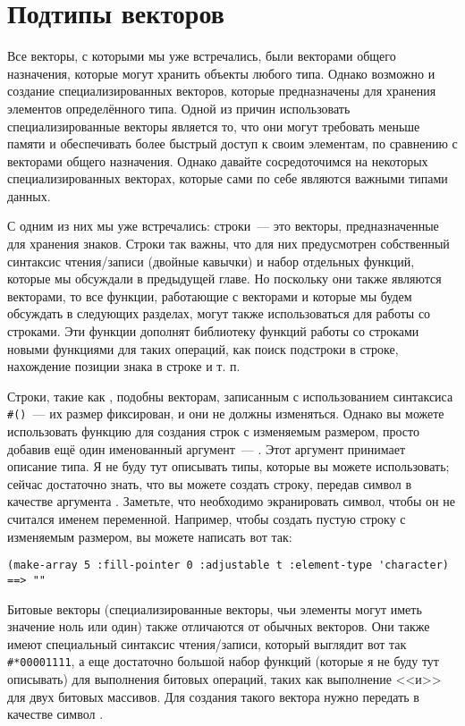 \section{Подтипы векторов}

Все векторы, с которыми мы уже встречались, были векторами общего назначения, которые
могут хранить объекты любого типа.  Однако возможно и создание специализированных
векторов, которые предназначены для хранения элементов определённого типа.  Одной из
причин использовать специализированные векторы является то, что они могут требовать
меньше памяти и обеспечивать более быстрый доступ к своим элементам, по сравнению с
векторами общего назначения.  Однако давайте сосредоточимся на некоторых
специализированных векторах, которые сами по себе являются важными типами данных.

С одним из них мы уже встречались: строки~--- это векторы, предназначенные для хранения
знаков.  Строки так важны, что для них предусмотрен собственный синтаксис чтения/записи
(двойные кавычки) и набор отдельных функций, которые мы обсуждали в предыдущей главе.  Но
поскольку они также являются векторами, то все функции, работающие с векторами и которые мы
будем обсуждать в следующих разделах, могут также использоваться для работы со строками.
Эти функции дополнят библиотеку функций работы со строками новыми функциями для таких
операций, как поиск подстроки в строке, нахождение позиции знака в строке и т. п.

Строки, такие как , подобны векторам, записанным с использованием синтаксиса
\lstinline!#()!~--- их размер фиксирован, и они не должны изменяться.  Однако вы можете
использовать функцию  для создания строк с изменяемым размером, просто
добавив ещё один именованный аргумент~--- .  Этот аргумент принимает
описание типа.  Я не буду тут описывать типы, которые вы можете использовать; сейчас
достаточно знать, что вы можете создать строку, передав символ  в
качестве аргумента .  Заметьте, что необходимо экранировать
символ, чтобы он не считался именем переменной.  Например, чтобы создать пустую строку с
изменяемым размером, вы можете написать вот так:

\begin{lstlisting}[style=lisprepl]
  (make-array 5 :fill-pointer 0 :adjustable t :element-type 'character) ==> ""
\end{lstlisting}

Битовые векторы (специализированные векторы, чьи элементы могут иметь значение ноль или
один) также отличаются от обычных векторов.  Они также имеют специальный синтаксис
чтения/записи, который выглядит вот так \lstinline!#*00001111!, а еще достаточно большой
набор функций (которые я не буду тут описывать) для выполнения битовых операций, таких как
выполнение <<и>> для двух битовых массивов.  Для создания такого вектора нужно передать
в качестве  символ .

